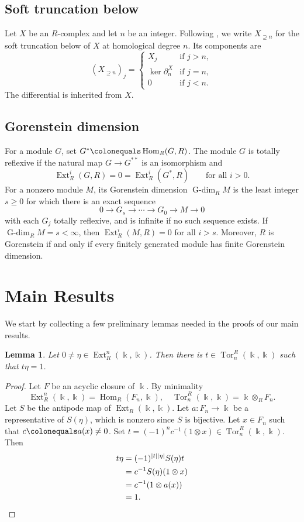 \documentclass{amsart}
\newtheorem{lemma}[theorem]{Lemma}
\theoremstyle{definition}
\theoremstyle{definition}
\theoremstyle{remark}
\numberwithin{equation}{section}
\newcommand{\kk}{\Bbbk}
\newcommand{\Ext}{\operatorname{Ext}}
\newcommand{\Hom}{\operatorname{Hom}}
\newcommand{\gdim}{\operatorname{G-dim}}
\newcommand{\Tor}{\operatorname{Tor}}
\begin{document}
\subsection*{Soft truncation below}
Let $X$ be an $R$-complex and let $n$ be an integer. Following
\cite[Definition 2.5.23]{LarsBook}, we write $X_{\supseteq n}$ for the
soft truncation below of $X$ at homological degree $n$. Its components are
\[
(X_{\supseteq n})_j=
\begin{cases}
X_j & \text{if }j>n,\\
\ker\partial_n^X & \text{if }j=n,\\
0 & \text{if }j<n.
\end{cases}
\]
The differential is inherited from $X$. 

\subsection*{Gorenstein dimension}
For a module $G$, set $G^*\colonequals\Hom_R(G,R)$. The module $G$ is
totally reflexive if the natural map $G\rightarrow G^{**}$ is an
isomorphism and
\[
\Ext_R^i(G,R)=0=\Ext_R^i(G^*,R)\qquad\text{for all }i>0.
\]
For a nonzero module $M$, its Gorenstein dimension $\gdim_RM$ is the
least integer $s\geq0$ for which there is an exact sequence
\[
0\longrightarrow G_s\longrightarrow\cdots\longrightarrow G_0
\longrightarrow M\longrightarrow0
\]
with each $G_j$ totally reflexive, and is infinite if no such sequence
exists. If $\gdim_RM=s<\infty$, then
$\Ext_R^i(M,R)=0$ for all $i>s$. Moreover, $R$ is Gorenstein if and
only if every finitely generated module has finite Gorenstein dimension.
\section{Main Results}
We start by collecting a few preliminary lemmas needed in the proofs of our main results.
\begin{lemma}\label{lem:duality}
Let $0\neq\eta\in\Ext_R^n(\kk,\kk)$. Then there is $t\in\Tor_n^R(\kk,\kk)$ such that $t\eta=1$.
\end{lemma}
\begin{proof}
Let $F$ be an acyclic closure of $\kk$. By minimality
\[
\Ext_R^n(\kk,\kk)=\Hom_R(F_n,\kk),\quad\Tor_n^R(\kk,\kk)=\kk\otimes_RF_n.
\]
Let $S$ be the antipode map of $\Ext_R(\kk,\kk)$. Let $a:F_n\rightarrow\kk$ be a representative of $S(\eta)$, which is nonzero since $S$ is bijective. Let $x\in F_n$ such that $c\colonequals a(x)\neq0$. Set $t=(-1)^nc^{-1}(1\otimes x)\in\Tor_n^R(\kk,\kk)$. Then
\begin{align*}
t\eta&=(-1)^{|t||\eta|}S(\eta)t\\
&=c^{-1}S(\eta)(1\otimes x)\\
&=c^{-1}(1\otimes a(x))\\
&=1.\qedhere
\end{align*}
\end{proof}
\end{document}
